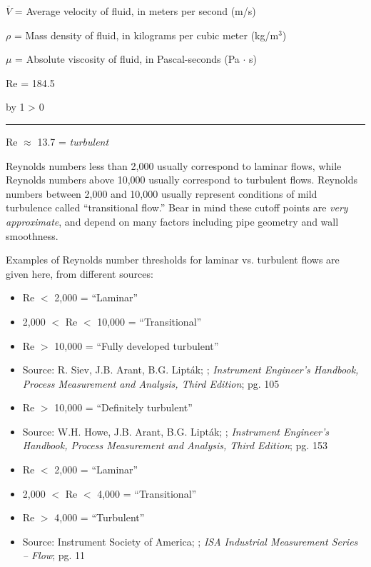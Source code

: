 \documentclass[12pt,a4paper]{article}
\def\svar{
           \advance\answnum by 1
           \ifnum \answnum > 0
                \hrule
                \vskip 3pt
                \leftline{Svar \the\answnum}
                \vskip 3pt \fi}
\begin{document}
$\overline{V}$ = Average velocity of fluid, in meters per second (m/s)

$\rho$ = Mass density of fluid, in kilograms per cubic meter (kg/m$^{3}$)

$\mu$ = Absolute viscosity of fluid, in Pascal-seconds (Pa $\cdot$ s)

\vskip 60pt \goodbreak

Re = 184.5

\vskip 10pt \filbreak 
\svar{} 

Re $\approx$ 13.7 = {\it turbulent}

\vskip 10pt

Reynolds numbers less than 2,000 usually correspond to laminar flows, while Reynolds numbers above 10,000 usually correspond to turbulent flows.  Reynolds numbers between 2,000 and 10,000 usually represent conditions of mild turbulence called ``transitional flow.''  Bear in mind these cutoff points are {\it very approximate}, and depend on many factors including pipe geometry and wall smoothness.

Examples of Reynolds number thresholds for laminar vs. turbulent flows are given here, from different sources:

\begin{itemize}
\goodbreak
\item{} Re $<$ 2,000 = ``Laminar''
\item{} 2,000 $<$ Re $<$ 10,000 = ``Transitional''
\item{} Re $>$ 10,000 = ``Fully developed turbulent''
\item{} Source: R. Siev, J.B. Arant, B.G. Lipt\'ak; ; {\it Instrument Engineer's Handbook, Process Measurement and Analysis, Third Edition}; pg. 105
\end{itemize}

\begin{itemize}
\goodbreak
\item{} Re $>$ 10,000 = ``Definitely turbulent''
\item{} Source: W.H. Howe, J.B. Arant, B.G. Lipt\'ak; ; {\it Instrument Engineer's Handbook, Process Measurement and Analysis, Third Edition}; pg. 153
\end{itemize}

\begin{itemize}
\goodbreak
\item{} Re $<$ 2,000 = ``Laminar''
\item{} 2,000 $<$ Re $<$ 4,000 = ``Transitional''
\item{} Re $>$ 4,000 = ``Turbulent''
\item{} Source: Instrument Society of America; ; {\it ISA Industrial Measurement Series -- Flow}; pg. 11
\end{itemize}
\end{document}
